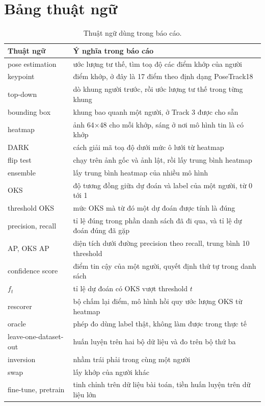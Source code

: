 \documentclass[11pt,a4paper]{article}
\begin{document}
\appendix
\section{Bảng thuật ngữ}
\label{app:glossary}

\begin{table}[H]
\centering\small
\begin{tabularx}{\linewidth}{@{}lX@{}}
\toprule
Thuật ngữ & Ý nghĩa trong báo cáo \\
\midrule
pose estimation & ước lượng tư thế, tìm toạ độ các điểm khớp của người \\
keypoint & điểm khớp, ở đây là 17 điểm theo định dạng PoseTrack18 \\
top-down & dò khung người trước, rồi ước lượng tư thế trong từng khung \\
bounding box & khung bao quanh một người, ở Track 3 được cho sẵn \\
heatmap & ảnh 64×48 cho mỗi khớp, sáng ở nơi mô hình tin là có khớp \\
DARK & cách giải mã toạ độ dưới mức ô lưới từ heatmap \\
flip test & chạy trên ảnh gốc và ảnh lật, rồi lấy trung bình heatmap \\
ensemble & lấy trung bình heatmap của nhiều mô hình \\
OKS & độ tương đồng giữa dự đoán và label của một người, từ 0 tới 1 \\
threshold OKS & mức OKS mà từ đó một dự đoán được tính là đúng \\
precision, recall & tỉ lệ đúng trong phần danh sách đã đi qua, và tỉ lệ dự đoán đúng đã gặp \\
AP, OKS AP & diện tích dưới đường precision theo recall, trung bình 10 threshold \\
confidence score & điểm tin cậy của một người, quyết định thứ tự trong danh sách \\
$f_t$ & tỉ lệ dự đoán có OKS vượt threshold $t$ \\
rescorer & bộ chấm lại điểm, mô hình hồi quy ước lượng OKS từ heatmap \\
oracle & phép đo dùng label thật, không làm được trong thực tế \\
leave-one-dataset-out & huấn luyện trên hai bộ dữ liệu và đo trên bộ thứ ba \\
inversion & nhầm trái phải trong cùng một người \\
swap & lấy khớp của người khác \\
fine-tune, pretrain & tinh chỉnh trên dữ liệu bài toán, tiền huấn luyện trên dữ liệu lớn \\
\bottomrule
\end{tabularx}
\caption{Thuật ngữ dùng trong báo cáo.}
\end{table}
\end{document}
